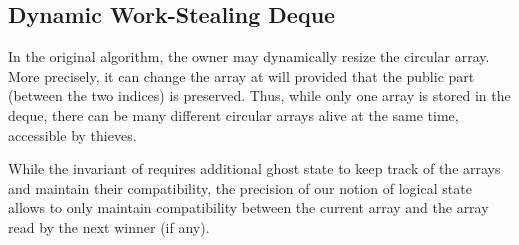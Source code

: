 \subsection{Dynamic Work-Stealing Deque}

In the original algorithm, the owner may dynamically resize the circular array.
More precisely, it can change the array at will provided that the public part (between the two indices) is preserved.
Thus, while only one array is stored in the deque, there can be many different circular arrays alive at the same time, \ie accessible by thieves.

While the invariant of \citet{DBLP:journals/corr/abs-2309-03642} requires additional ghost state to keep track of the arrays and maintain their compatibility, the precision of our notion of logical state allows to only maintain compatibility between the current array and the array read by the next winner (if any).
